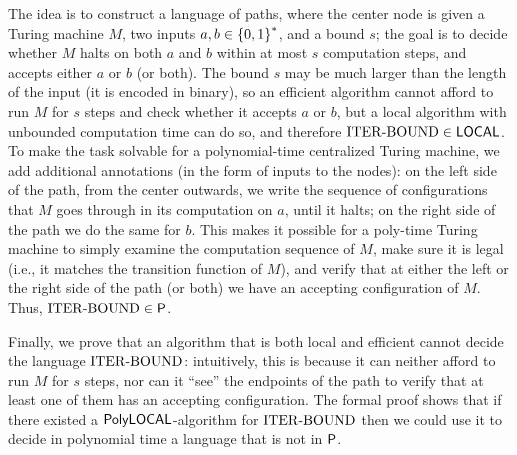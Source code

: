 The idea is to construct a language of paths,
where the center node is given a Turing machine $M$, two inputs $a,b \in \left \{{0,1} \right \}^*$,
and a bound $s$;
the goal is to decide whether $M$ halts on both $a$ and $b$ within at most $s$
computation steps, and accepts either $a$ or $b$ (or both).
The bound $s$ may be much larger than the length of the input (it is encoded in binary),
so an efficient algorithm cannot afford to run $M$ for $s$ steps and check
whether it accepts $a$ or $b$,
but a local algorithm with unbounded computation time can do so,
and therefore ${\mathrm{ITER\text{-}BOUND}} \in {\mathsf{LOCAL}}$.
To make the task solvable for a polynomial-time centralized Turing machine,
we add additional annotations (in the form of inputs to the nodes):
on the left side of the path, from the center outwards, we write 
the sequence of configurations that $M$ goes through in its computation on $a$,
until it halts;
on the right side of the path we do the same for $b$.
This makes it possible for a poly-time Turing machine to simply examine
the computation sequence of $M$, make sure it is legal (i.e., it matches the transition function of $M$),
and verify that at either the left or the right side of the path (or both)
we have
an accepting configuration of $M$.
Thus, ${\mathrm{ITER\text{-}BOUND}} \in {\mathsf{P}}$.

Finally, we prove that an algorithm that is both local and efficient cannot
decide the language ${\mathrm{ITER\text{-}BOUND}}$: intuitively, this is because 
it can neither afford to run $M$ for $s$ steps, nor can it ``see''
the endpoints of the path to verify that at least one of them has an accepting configuration.
The formal proof shows that if there existed a $\mathsf{PolyLOCAL}$-algorithm for ${\mathrm{ITER\text{-}BOUND}}$
then we could use it to decide in polynomial time a language
that is not in ${\mathsf{P}}$.


